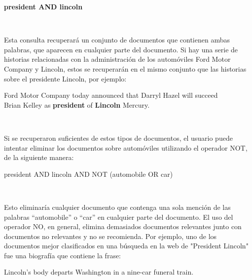 \begin{center}
	\begin{minipage}{13cm}	
		\textbf{president AND lincoln}\\
	\end{minipage}\\
\end{center}

Esta consulta recuperará un conjunto de documentos que contienen ambas palabras, que aparecen en cualquier parte del documento. Si hay una serie de historias relacionadas con la administración de los automóviles Ford Motor Company y Lincoln, estos se recuperarán en el mismo conjunto que las historias sobre el presidente Lincoln, por ejemplo:

\begin{center}
	\begin{minipage}{13cm}	
		Ford Motor Company today announced that Darryl Hazel will succeed\\
		Brian Kelley as \textbf{president} of \textbf{Lincoln} Mercury.\\
	\end{minipage}\\
\end{center}

Si se recuperaron suficientes de estos tipos de documentos, el usuario puede intentar eliminar los documentos sobre automóviles utilizando el operador NOT, de la siguiente manera:

\begin{center}
	\begin{minipage}{13cm}	
		president AND lincoln AND NOT (automobile OR car)\\
	\end{minipage}\\
\end{center}

Esto eliminaría cualquier documento que contenga una sola mención de las palabras “automobile” o “car” en cualquier parte del documento. El uso del operador NO, en general, elimina demasiados documentos relevantes junto con documentos no relevantes y no se recomienda. Por ejemplo, uno de los documentos mejor clasificados en una búsqueda en la web de "President Lincoln" fue una biografía que contiene la frase:

\begin{center}
	\begin{minipage}{13cm}	
		Lincoln’s body departs Washington in a nine-car funeral train.\\
	\end{minipage}\\
\end{center}

